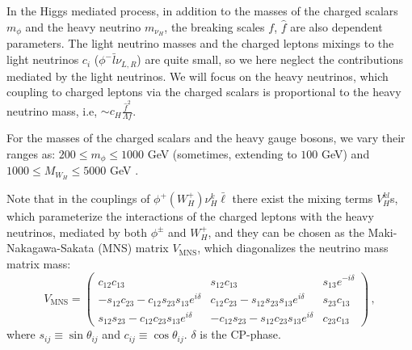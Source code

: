\documentclass[preprint,aps,12pt,showpacs,nofootinbib,tightenlines]{revtex4}
\def\bmaT{\left(\begin{array}{ccc}}
\def\emaT{\end{array}\right)}
\newcommand{\MNS}{{\text{MNS}}}
\begin{document}
In the Higgs mediated process, in addition to the masses of the charged scalars $m_\phi $
and the heavy neutrino $m_{\nu_H}$, the breaking scales $f$, $\hat f$ are also dependent parameters.
The light neutrino masses and the charged leptons mixings to the light neutrinos $c_i$ ($\phi^-\bar l \nu_{L,R}$)
are quite small, so we here neglect the contributions mediated by the light neutrinos.
We will focus on the heavy neutrinos, which coupling to charged leptons via the charged scalars is
 proportional to the heavy neutrino mass, i.e, $\sim c_H\frac{\hat f^2}{\Lambda f}$.

For the masses of the charged scalars and the heavy gauge bosons, we vary their ranges as:
$200 \leq m_\phi  \leq 1000$ GeV \cite{charged_higgs_mass} (sometimes, extending to $100$ GeV)
and $1000 \leq M_{W_H} \leq 5000 $ GeV \cite{w_h_constraints}.




Note that in the couplings of $\phi^+(W_H^+)\nu_H^k \bar \ell$ there exist the mixing terms $V_H^{kl}$s, which
parameterize the interactions of the charged leptons with the heavy neutrinos, mediated by both $\phi^\pm$ and $W_H^+$,
and they can be chosen as the Maki-Nakagawa-Sakata (MNS) matrix $V_\MNS$, which
diagonalizes the neutrino mass matrix mass\cite{Maki:1962mu,07124019}:
\begin{equation} \label{vmns}
V_\MNS^{} =
\bmaT
c_{12}c_{13}                        & s_{12}c_{13}                  & s_{13}e^{-i\delta} \\
-s_{12}c_{23}-c_{12}s_{23}s_{13}e^{i\delta}  & c_{12}c_{23}-s_{12}s_{23}s_{13}e^{i\delta}  & s_{23}c_{13} \\
s_{12}s_{23}-c_{12}c_{23}s_{13}e^{i\delta}   & -c_{12}s_{23}-s_{12}c_{23}s_{13}e^{i\delta} & c_{23}c_{13}
\emaT
\,,
\end{equation}
where $s_{ij}\equiv\sin\theta_{ij}$ and $c_{ij}\equiv \cos\theta_{ij}$. $\delta$ is the CP-phase.
\end{document}
